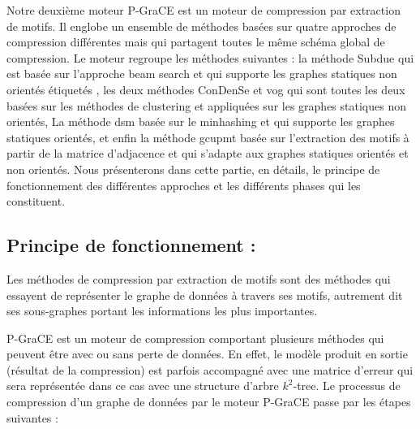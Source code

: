 \documentclass[a4paper,oneside,12pt]{report}
\theoremstyle{definition}
\begin{document}
	Notre deuxième moteur \gls{P-GraCE} est un moteur de compression par extraction de motifs. Il englobe un ensemble de méthodes basées sur quatre  approches de compression différentes mais qui partagent toutes le même schéma global de compression. Le moteur regroupe les méthodes suivantes : la méthode Subdue \citep{ketkar2005subdue} qui est basée sur l'approche beam search et qui supporte les graphes statiques non orientés étiquetés , les deux méthodes \gls{ConDenSe} \citep{liu2018reducing} et \gls{vog} \citep{koutra2015summarizing} qui sont toutes les deux basées sur les méthodes de clustering et appliquées sur les graphes statiques non orientés, La méthode \gls{dsm} \citep{hernandez2014compressed} basée sur le minhashing et qui supporte les graphes statiques orientés, et enfin la méthode \gls{gcupmt} \citep{shah2018graph} basée sur l'extraction des motifs à partir de la matrice d'adjacence et qui s'adapte aux graphes statiques orientés et non orientés.  Nous présenterons dans cette partie, en détails, le principe de fonctionnement des différentes approches et les différents phases qui les constituent.
	
		\subsection{Principe de fonctionnement :}
		
		Les méthodes de compression par extraction de motifs sont des méthodes qui essayent de représenter le graphe de données à travers ses motifs, autrement dit ses sous-graphes portant les informations les plus importantes. 
		
		P-GraCE est un moteur de compression comportant plusieurs méthodes qui peuvent être avec ou sans perte de données. 
		En effet, le modèle produit en sortie (résultat de la compression) est parfois accompagné avec une matrice d'erreur qui sera représentée dans ce cas avec une structure d'arbre $k^2$-tree. Le processus de compression d'un graphe de données par le moteur P-GraCE passe par les étapes suivantes :
		
\end{document}
